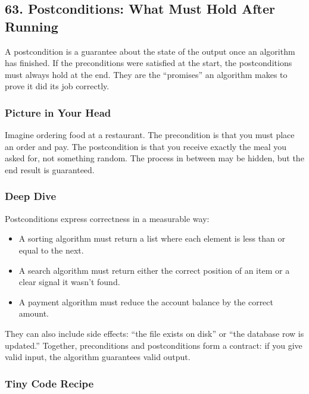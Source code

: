 \documentclass[
  letterpaper,
  DIV=11,
  numbers=noendperiod]{scrreprt}
\providecommand{\tightlist}{%
  \setlength{\itemsep}{0pt}\setlength{\parskip}{0pt}}
\begin{document}
\subsection{63. Postconditions: What Must Hold After
Running}\label{postconditions-what-must-hold-after-running}

A postcondition is a guarantee about the state of the output once an
algorithm has finished. If the preconditions were satisfied at the
start, the postconditions must always hold at the end. They are the
``promises'' an algorithm makes to prove it did its job correctly.

\subsubsection{Picture in Your Head}\label{picture-in-your-head-62}

Imagine ordering food at a restaurant. The precondition is that you must
place an order and pay. The postcondition is that you receive exactly
the meal you asked for, not something random. The process in between may
be hidden, but the end result is guaranteed.

\subsubsection{Deep Dive}\label{deep-dive-32}

Postconditions express correctness in a measurable way:

\begin{itemize}
\tightlist
\item
  A sorting algorithm must return a list where each element is less than
  or equal to the next.
\item
  A search algorithm must return either the correct position of an item
  or a clear signal it wasn't found.
\item
  A payment algorithm must reduce the account balance by the correct
  amount.
\end{itemize}

They can also include side effects: ``the file exists on disk'' or ``the
database row is updated.'' Together, preconditions and postconditions
form a contract: if you give valid input, the algorithm guarantees valid
output.

\subsubsection{Tiny Code Recipe}\label{tiny-code-recipe-60}
\end{document}
